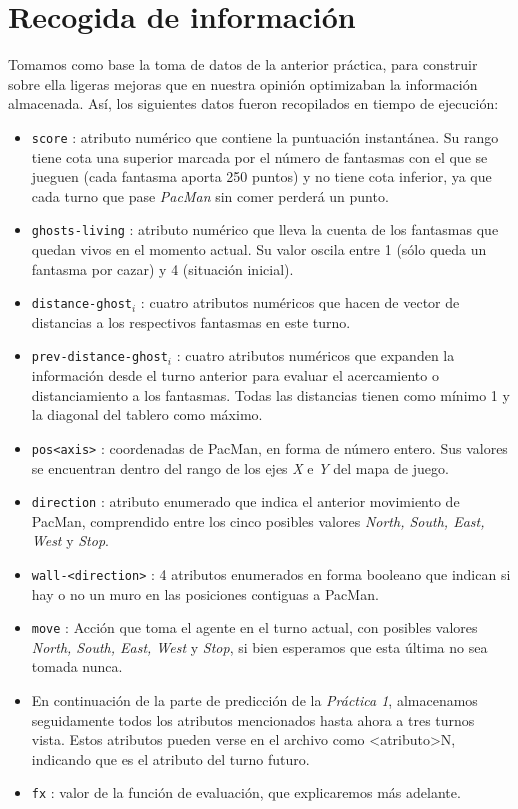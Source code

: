 \documentclass[12pt]{article}
\begin{document}
\newpage
\section{Recogida de información}


Tomamos como base la toma de datos de la anterior práctica, para construir sobre ella ligeras mejoras que en nuestra opinión optimizaban la información almacenada. Así, los siguientes datos fueron recopilados en tiempo de ejecución:

\begin{itemize}
    \item \texttt{score} : atributo numérico que contiene la puntuación instantánea. Su rango tiene cota una superior marcada por el número de fantasmas con el que se jueguen (cada fantasma aporta 250 puntos) y no tiene cota inferior, ya que cada turno que pase \textit{PacMan} sin comer perderá un punto.
    \item \texttt{ghosts-living} : atributo numérico que lleva la cuenta de los fantasmas que quedan vivos en el momento actual. Su valor oscila entre 1 (sólo queda un fantasma por cazar) y 4 (situación inicial).
    \item \texttt{distance-ghost}$_{i}$ : cuatro atributos numéricos que hacen de vector de distancias a los respectivos fantasmas en este turno.
    \item \texttt{prev-distance-ghost}$_{i}$ : cuatro atributos numéricos que expanden la información desde el turno anterior para evaluar el acercamiento o distanciamiento a los fantasmas. Todas las distancias tienen como mínimo 1 y la diagonal del tablero como máximo.
    \item \texttt{pos\textless axis\textgreater} : coordenadas de PacMan, en forma de número entero. Sus valores se encuentran dentro del rango de los ejes \textit{X} e \textit{Y} del mapa de juego.
    \item \texttt{direction} : atributo enumerado que indica el anterior movimiento de PacMan, comprendido entre los cinco posibles valores \textit{North, South, East, West} y \textit {Stop}.
    \item \texttt{wall-\textless direction\textgreater} : 4 atributos enumerados en forma booleano que indican si hay o no un muro en las posiciones contiguas a PacMan.
    \item \texttt{move} : Acción que toma el agente en el turno actual, con posibles valores \textit{North, South, East, West} y \textit {Stop}, si bien esperamos que esta última no sea tomada nunca.
    \item En continuación de la parte de predicción de la \textit{Práctica 1}, almacenamos seguidamente todos los atributos mencionados hasta ahora a tres turnos vista. Estos atributos pueden verse en el archivo como \textless atributo\textgreater N, indicando que es el atributo del turno futuro.
    \item \texttt{fx} : valor de la función de evaluación, que explicaremos más adelante.
\end{itemize}
\end{document}
